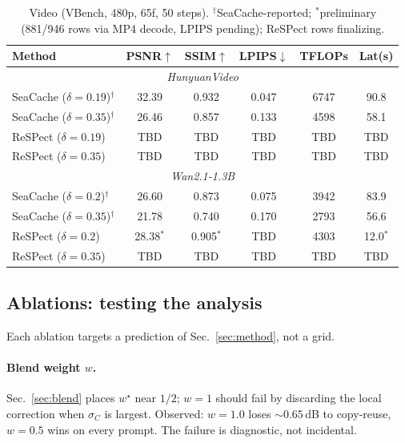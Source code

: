 \documentclass[10pt,twocolumn,letterpaper]{article}
\begin{document}
\begin{table}[t]
  \centering
  \caption{Video (VBench, 480p, 65f, 50 steps).
  $^\dagger$SeaCache-reported; $^*$preliminary (881/946 rows via MP4 decode,
  LPIPS pending); ReSPect rows finalizing.}
  \label{tab:video}
  {\small
  \begin{tabular}{lccccc}
    \toprule
    Method & PSNR$\uparrow$ & SSIM$\uparrow$ & LPIPS$\downarrow$ & TFLOPs & Lat(s) \\
    \midrule
    \multicolumn{6}{c}{\textit{HunyuanVideo}} \\
    SeaCache ($\delta{=}0.19$)$^\dagger$ & 32.39 & 0.932 & 0.047 & 6747 & 90.8 \\
    SeaCache ($\delta{=}0.35$)$^\dagger$ & 26.46 & 0.857 & 0.133 & 4598 & 58.1 \\
    ReSPect ($\delta{=}0.19$) & TBD & TBD & TBD & TBD & TBD \\
    ReSPect ($\delta{=}0.35$) & TBD & TBD & TBD & TBD & TBD \\
    \midrule
    \multicolumn{6}{c}{\textit{Wan2.1-1.3B}} \\
    SeaCache ($\delta{=}0.2$)$^\dagger$ & 26.60 & 0.873 & 0.075 & 3942 & 83.9 \\
    SeaCache ($\delta{=}0.35$)$^\dagger$ & 21.78 & 0.740 & 0.170 & 2793 & 56.6 \\
    ReSPect ($\delta{=}0.2$) & 28.38$^*$ & 0.905$^*$ & TBD & 4303 & 12.0$^*$ \\
    ReSPect ($\delta{=}0.35$) & TBD & TBD & TBD & TBD & TBD \\
    \bottomrule
  \end{tabular}}
\end{table}

\subsection{Ablations: testing the analysis}
\label{sec:ablation}

Each ablation targets a prediction of Sec.~\ref{sec:method}, not a grid.

\paragraph{Blend weight $w$.}
Sec.~\ref{sec:blend} places $w^\star$ near $1/2$; $w{=}1$ should fail by
discarding the local correction when $\sigma_C$ is largest. Observed:
$w{=}1.0$ loses ${\sim}0.65$\,dB to copy-reuse, $w{=}0.5$ wins on every
prompt. The failure is diagnostic, not incidental.
\end{document}
